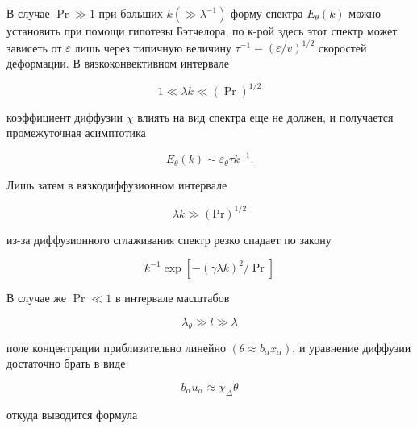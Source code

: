 \documentclass[10pt]{article}
\begin{document}
В случае $\operatorname{Pr} \gg 1$ при больших $k\left(\gg \lambda^{-1}\right)$ форму спектра $E_{\theta}(k)$ можно установить при помощи гипотезы Бэтчелора, по к-рой здесь этот спектр может зависеть от $\varepsilon$ лишь через типичную величину $\tau^{-1}=(\varepsilon / v)^{1 / 2}$ скоростей деформации. В вязкоконвективном интервале



\[

1 \ll \lambda k \ll(\operatorname{Pr})^{1 / 2}

\]



коэффициент диффузии $\chi$ влиять на вид спектра еще не должен, и получается промежуточная асимптотика



\[

E_{\theta}(k) \sim \varepsilon_{\theta} \tau k^{-1} .

\]



Лишь затем в вязкодиффузионном интервале



\[

\lambda k \gg(\mathrm{Pr})^{1 / 2}

\]



из-за диффузионного сглаживания спектр резко спадает по закону



\[

k^{-1} \exp \left[-(\gamma \lambda k)^{2} / \operatorname{Pr}\right]

\]



В случае же $\operatorname{Pr} \ll 1$ в интервале масштабов



\[

\lambda_{\theta} \gg l \gg \lambda

\]



поле концентрации приблизительно линейно $\left(\theta \approx b_{\alpha} x_{\alpha}\right)$, и уравнение диффузии достаточно брать в виде



\[

b_{\alpha} u_{\alpha} \approx \chi_{\Delta} \theta

\]



откуда выводится формула
\end{document}

